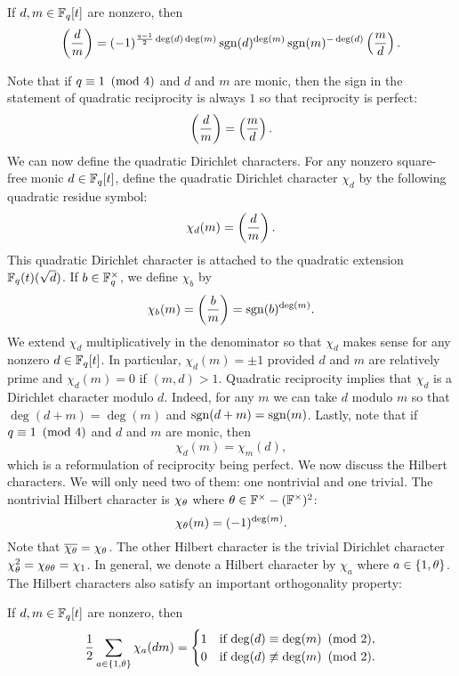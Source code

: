 \documentclass[12pt,reqno,oneside]{amsart}
\begin{document}
    \begin{theorem}
        If $d,m \in \mathbb{F}_{q}[t]$ are nonzero, then
        \[
            \left(\frac{d}{m}\right) = (-1)^{\frac{q-1}{2}\deg(d)\deg(m)}\operatorname{\mathrm{sgn}}(d)^{\deg(m)}\operatorname{\mathrm{sgn}}(m)^{-\deg(d)}\left(\frac{m}{d}\right).
        \]
    \end{theorem}

    Note that if $q \equiv 1 \ \left(\text{mod }4\right)$ and $d$ and $m$ are monic, then the sign in the statement of quadratic reciprocity is always $1$ so that reciprocity is perfect:
    \[
        \left(\frac{d}{m}\right) = \left(\frac{m}{d}\right).
    \]
    We can now define the quadratic Dirichlet characters. For any nonzero square-free monic $d \in \mathbb{F}_{q}[t]$, define the quadratic Dirichlet character $\chi_{d}$ by the following quadratic residue symbol:
    \[
        \chi_{d}(m) = \left(\frac{d}{m}\right).
    \]
    This quadratic Dirichlet character is attached to the quadratic extension $\mathbb{F}_{q}(t)(\sqrt{d})$. If $b \in \mathbb{F}_{q}^{\times}$, we define $\chi_{b}$ by
    \[
        \chi_{b}(m) = \left(\frac{b}{m}\right) = \operatorname{\mathrm{sgn}}(b)^{\deg(m)}.
    \]
    We extend $\chi_{d}$ multiplicatively in the denominator so that $\chi_{d}$ makes sense for any nonzero $d \in \mathbb{F}_{q}[t]$. In particular, $\chi_{d}(m) = \pm1$ provided $d$ and $m$ are relatively prime and $\chi_{d}(m) = 0$ if $(m,d) > 1$. Quadratic reciprocity implies that $\chi_{d}$ is a Dirichlet character modulo $d$. Indeed, for any $m$ we can take $d$ modulo $m$ so that $\deg(d+m) = \deg(m)$ and $\operatorname{\mathrm{sgn}}(d+m) = \operatorname{\mathrm{sgn}}(m)$. Lastly, note that if $q \equiv 1 \ \left(\text{mod }4\right)$ and $d$ and $m$ are monic, then
    \[
        \chi_{d}(m) = \chi_{m}(d),
    \]
    which is a reformulation of reciprocity being perfect. We now discuss the Hilbert characters. We will only need two of them: one nontrivial and one trivial. The nontrivial Hilbert character is $\chi_{\theta}$ where $\theta \in \mathbb{F}^{\times}-(\mathbb{F}^{\times})^{2}$:
    \[
        \chi_{\theta}(m) = (-1)^{\deg(m)}.
    \]
    Note that $\overline{\chi_{\theta}} = \chi_{\theta}$. The other Hilbert character is the trivial Dirichlet character $\chi_{\theta}^{2} = \chi_{\theta\theta} = \chi_{1}$. In general, we denote a Hilbert character by $\chi_{a}$ where $a \in \{1,\theta\}$. The Hilbert characters also satisfy an important orthogonality property:

    \begin{theorem}
        If $d,m \in \mathbb{F}_{q}[t]$ are nonzero, then
        \[
            \frac{1}{2}\sum_{a \in \{1,\theta\}}\chi_{a}(dm) = \begin{cases} 1 & \text{if $\deg(d) \equiv \deg(m) \ \left(\text{mod }2\right)$}, \\ 0 & \text{if $\deg(d) \not\equiv \deg(m) \ \left(\text{mod }2\right)$}. \end{cases}
        \]
    \end{theorem}
    
\end{document}
